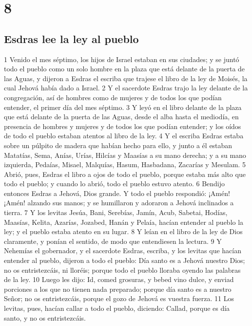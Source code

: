 \chapter{8}

\section*{Esdras lee la ley al pueblo}

1 Venido el mes séptimo, los hijos de Israel estaban en sus ciudades; y se juntó todo el pueblo como un solo hombre en la plaza que está delante de la puerta de las Aguas, y dijeron a Esdras el escriba que trajese el libro de la ley de Moisés, la cual Jehová había dado a Israel.
2 Y el sacerdote Esdras trajo la ley delante de la congregación, así de hombres como de mujeres y de todos los que podían entender, el primer día del mes séptimo.
3 Y leyó en el libro delante de la plaza que está delante de la puerta de las Aguas, desde el alba hasta el mediodía, en presencia de hombres y mujeres y de todos los que podían entender; y los oídos de todo el pueblo estaban atentos al libro de la ley.
4 Y el escriba Esdras estaba sobre un púlpito de madera que habían hecho para ello, y junto a él estaban Matatías, Sema, Anías, Urías, Hilcías y Maasías a su mano derecha; y a su mano izquierda, Pedaías, Misael, Malquías, Hasum, Hasbadana, Zacarías y Mesulam.
5 Abrió, pues, Esdras el libro a ojos de todo el pueblo, porque estaba más alto que todo el pueblo; y cuando lo abrió, todo el pueblo estuvo atento.
6 Bendijo entonces Esdras a Jehová, Dios grande. Y todo el pueblo respondió: ¡Amén! ¡Amén! alzando sus manos; y se humillaron y adoraron a Jehová inclinados a tierra.
7 Y los levitas Jesúa, Bani, Serebías, Jamín, Acub, Sabetai, Hodías, Maasías, Kelita, Azarías, Jozabed, Hanán y Pelaía, hacían entender al pueblo la ley; y el pueblo estaba atento en su lugar.
8 Y leían en el libro de la ley de Dios claramente, y ponían el sentido, de modo que entendiesen la lectura.
9 Y Nehemías el gobernador, y el sacerdote Esdras, escriba, y los levitas que hacían entender al pueblo, dijeron a todo el pueblo: Día santo es a Jehová nuestro Dios; no os entristezcáis, ni lloréis; porque todo el pueblo lloraba oyendo las palabras de la ley.
10 Luego les dijo: Id, comed grosuras, y bebed vino dulce, y enviad porciones a los que no tienen nada preparado; porque día santo es a nuestro Señor; no os entristezcáis, porque el gozo de Jehová es vuestra fuerza.
11 Los levitas, pues, hacían callar a todo el pueblo, diciendo: Callad, porque es día santo, y no os entristezcáis.
